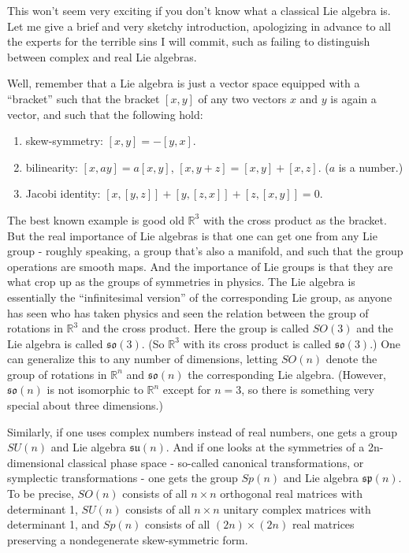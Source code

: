\documentclass{article}
\def\tightlist{}
\begin{document}
This won't seem very exciting if you don't know what a classical Lie
algebra is. Let me give a brief and very sketchy introduction,
apologizing in advance to all the experts for the terrible sins I will
commit, such as failing to distinguish between complex and real Lie
algebras.

Well, remember that a Lie algebra is just a vector space equipped with a
``bracket'' such that the bracket \([x,y]\) of any two vectors \(x\) and
\(y\) is again a vector, and such that the following hold:

\begin{enumerate}
\def\labelenumi{\alph{enumi})}
\tightlist
\item
  skew-symmetry: \([x,y] = -[y,x]\).
\item
  bilinearity: \([x,ay] = a[x,y]\), \([x,y+z] = [x,y] + [x,z]\). (\(a\)
  is a number.)
\item
  Jacobi identity: \([x,[y,z]] + [y,[z,x]] + [z,[x,y]] = 0\).
\end{enumerate}

The best known example is good old \(\mathbb{R}^3\) with the cross
product as the bracket. But the real importance of Lie algebras is that
one can get one from any Lie group - roughly speaking, a group that's
also a manifold, and such that the group operations are smooth maps. And
the importance of Lie groups is that they are what crop up as the groups
of symmetries in physics. The Lie algebra is essentially the
``infinitesimal version'' of the corresponding Lie group, as anyone has
seen who has taken physics and seen the relation between the group of
rotations in \(\mathbb{R}^3\) and the cross product. Here the group is
called \(SO(3)\) and the Lie algebra is called \(\mathfrak{so}(3)\). (So
\(\mathbb{R}^3\) with its cross product is called \(\mathfrak{so}(3)\).)
One can generalize this to any number of dimensions, letting \(SO(n)\)
denote the group of rotations in \(\mathbb{R}^n\) and
\(\mathfrak{so}(n)\) the corresponding Lie algebra. (However,
\(\mathfrak{so}(n)\) is not isomorphic to \(\mathbb{R}^n\) except for
\(n = 3\), so there is something very special about three dimensions.)

Similarly, if one uses complex numbers instead of real numbers, one gets
a group \(SU(n)\) and Lie algebra \(\mathfrak{su}(n)\). And if one looks
at the symmetries of a 2n-dimensional classical phase space - so-called
canonical transformations, or symplectic transformations - one gets the
group \(Sp(n)\) and Lie algebra \(\mathfrak{sp}(n)\). To be precise,
\(SO(n)\) consists of all \(n\times n\) orthogonal real matrices with
determinant 1, \(SU(n)\) consists of all \(n\times n\) unitary complex
matrices with determinant 1, and \(Sp(n)\) consists of all
\((2n)\times(2n)\) real matrices preserving a nondegenerate
skew-symmetric form.
\end{document}
